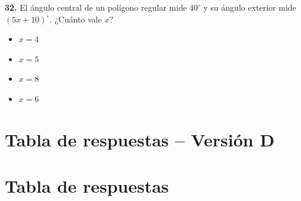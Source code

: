 \noindent\textbf{32.} El ángulo central de un polígono regular mide $40^\circ$ y su ángulo exterior mide $(5x+10)^\circ$. ¿Cuánto vale $x$?

\begin{itemize}
    \item[a)] $x=4$
    \item[b)] $x=5$
    \item[c)] $x=8$
    \item[d)] $x=6$
\end{itemize}


\newpage

\section*{Tabla de respuestas -- Versión D}

\section*{Tabla de respuestas}

